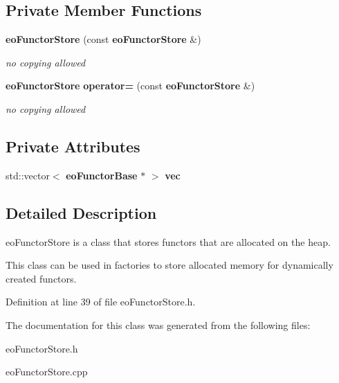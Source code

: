 \subsection*{Private Member Functions}
\begin{CompactItemize}
\item 
{\bf eo\-Functor\-Store} (const {\bf eo\-Functor\-Store} \&)\label{classeo_functor_store_d0}

\begin{CompactList}\small\item\em no copying allowed \item\end{CompactList}\item 
{\bf eo\-Functor\-Store} {\bf operator=} (const {\bf eo\-Functor\-Store} \&)\label{classeo_functor_store_d1}

\begin{CompactList}\small\item\em no copying allowed \item\end{CompactList}\end{CompactItemize}
\subsection*{Private Attributes}
\begin{CompactItemize}
\item 
std::vector$<$ {\bf eo\-Functor\-Base} $\ast$ $>$ {\bf vec}\label{classeo_functor_store_r0}

\end{CompactItemize}


\subsection{Detailed Description}
eo\-Functor\-Store is a class that stores functors that are allocated on the heap. 

This class can be used in factories to store allocated memory for dynamically created functors. 



Definition at line 39 of file eo\-Functor\-Store.h.

The documentation for this class was generated from the following files:\begin{CompactItemize}
\item 
eo\-Functor\-Store.h\item 
eo\-Functor\-Store.cpp\end{CompactItemize}
